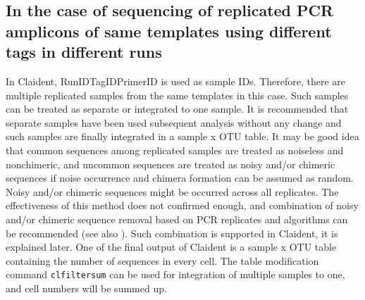 \documentclass[titlepage,10pt,a4paper,english]{jsbook}
\begin{document}
\subsection{In the case of sequencing of replicated PCR amplicons of same templates using different tags in different runs}

In Claident, RunID{\textunderscore}{\textunderscore}TagID{\textunderscore}{\textunderscore}PrimerID is used as sample IDs.
Therefore, there are multiple replicated samples from the same templates in this case.
Such samples can be treated as separate or integrated to one sample.
It is recommended that separate samples have been used subsequent analysis without any change and such samples are finally integrated in a sample x OTU table.
It may be good idea that common sequences among replicated samples are treated as noiseless and nonchimeric, and uncommon sequences are treated as noisy and/or chimeric sequences if noise occurrence and chimera formation can be assumed as random.
Noisy and/or chimeric sequences might be occurred across all replicates.
The effectiveness of this method does not confirmed enough, and combination of noisy and/or chimeric sequence removal based on PCR replicates and algorithms can be recommended (see also \citet{Lange2015}).
Such combination is supported in Claident, it is explained later.
One of the final output of Claident is a sample x OTU table containing the number of sequences in every cell.
The table modification command \texttt{clfiltersum} can be used for integration of multiple samples to one, and cell numbers will be summed up.
\end{document}
